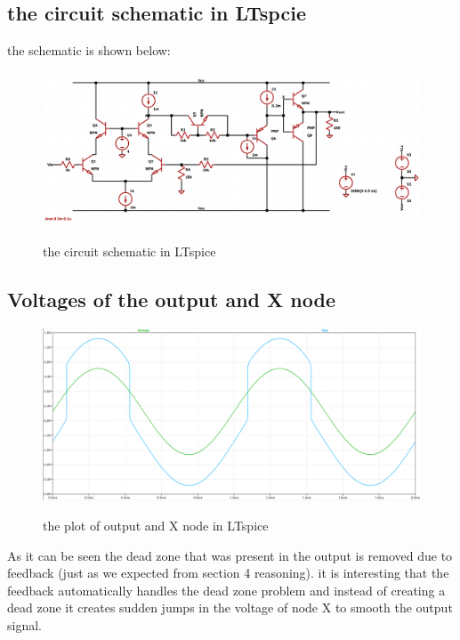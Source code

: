 \documentclass[11pt]{article}
\begin{document}
\subsection{the circuit schematic in LTspcie}
the schematic is shown below: \\
\begin{figure}[H]
    \begin{center}
        \includegraphics[scale=0.45]{Fig/circuitBasic.png}
        \label{fig:circuitBasic}
        \caption{the circuit schematic in LTspice}
    \end{center}
\end{figure}

\subsection{Voltages of the output and X node}

\begin{figure}[H]
    \begin{center}
        \includegraphics[scale=0.45]{Fig/outXBasic.png}
        \label{fig:outXBasic}
        \caption{the plot of output and X node in LTspice}
    \end{center}
\end{figure}

As it can be seen the dead zone that was present in the output is removed due to
feedback (just as we expected from section 4 reasoning). it is interesting that the feedback automatically handles the
dead zone problem and instead of creating a dead zone it creates sudden jumps in the voltage of
node X to smooth the output signal. \\
\end{document}
